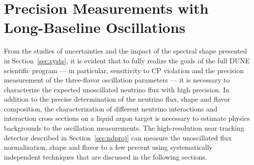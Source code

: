 \begin{table}[!htb]
\end{table}
\section{Precision Measurements with Long-Baseline Oscillations}
\label{sec-fluxosc}
From the studies of uncertainties and the impact of the spectral shape
presented in Section~\ref{sec:systs}, it is evident that to fully
realize the goals of the full DUNE scientific program --- in
particular, sensitivity to CP violation and the precision measurement
of the three-flavor oscillation parameters --- it is necessary to
characterize the expected unoscillated neutrino flux with high
precision. In addition to the precise determination of the neutrino
flux, shape and flavor composition, the characterization of different
neutrino interactions and interaction cross sections on a liquid argon target
is necessary to estimate physics backgrounds to the oscillation
measurements.  The high-resolution near tracking detector %
described in Section~\ref{sec:ndproj} can measure the unoscillated flux
normalization, shape and flavor to a few percent using systematically
independent techniques that are %
discussed in the following sections.
